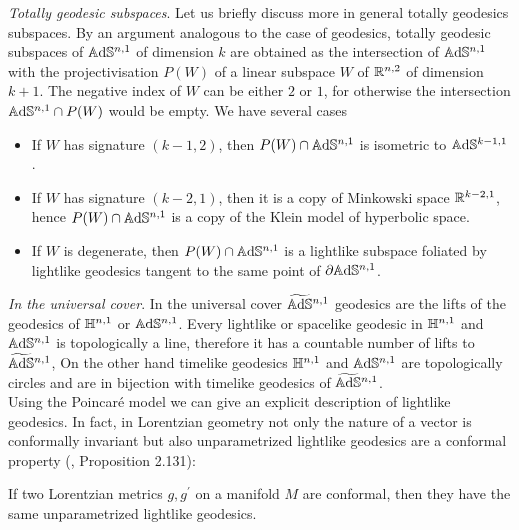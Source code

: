 \noindent \textit{Totally geodesic subspaces}. Let us briefly discuss more in general totally geodesics subspaces. By an argument analogous to the case of geodesics, totally geodesic subspaces of $\mathbb{A}\mathrm{d}\mathbb{S}^{n,1}$ of dimension $k$ are obtained as the intersection of $\mathbb{A}\mathrm{d}\mathbb{S}^{n,1}$ with the projectivisation $P(W)$ of a linear subspace $W$ of $\mathbb{R}^{n,2}$ of dimension $k+1$. The negative index of $W$ can be either $2$ or $1$, for otherwise the intersection $\mathbb{A}\mathrm{d}\mathbb{S}^{n,1}\cap P(W)$ would be empty.
We have several cases
\begin{itemize}
    \item If $W$ has signature $(k-1,2)$, then $P(W)\cap\mathbb{A}\mathrm{d}\mathbb{S}^{n,1}$  is isometric to $\mathbb{A}\mathrm{d}\mathbb{S}^{k-1,1}$.
    \item If $W$ has signature $(k-2,1)$, then it is a copy of Minkowski space $\mathbb{R}^{k-2,1}$, hence $P(W)\cap\mathbb{A}\mathrm{d}\mathbb{S}^{n,1}$ is a copy of the Klein model of hyperbolic space.
    \item If $W$ is degenerate, then $P(W)\cap\mathbb{A}\mathrm{d}\mathbb{S}^{n,1}$ is a lightlike subspace foliated by lightlike geodesics tangent to the same point of $\partial\mathbb{A}\mathrm{d}\mathbb{S}^{n,1}$. 
\end{itemize}

\noindent \textit{In the universal cover}. In the universal cover $\widetilde{\mathbb{A}\mathrm{d}\mathbb{S}}{}^{n,1}$ geodesics are the lifts of the geodesics of $\mathbb{H}^{n,1}$ or $\mathbb{A}\mathrm{d}\mathbb{S}^{n,1}$. Every lightlike or spacelike geodesic in $\mathbb{H}^{n,1}$ and $\mathbb{A}\mathrm{d}\mathbb{S}^{n,1}$ is topologically a line, therefore it has a countable number of lifts to $\widetilde{\mathbb{A}\mathrm{d}\mathbb{S}}{}^{n,1}$, On the other hand timelike geodesics $\mathbb{H}^{n,1}$ and $\mathbb{A}\mathrm{d}\mathbb{S}^{n,1}$ are topologically circles and are in bijection with timelike geodesics of $\widetilde{\mathbb{A}\mathrm{d}\mathbb{S}}{}^{n,1}$.\\
Using the Poincaré model we can give an explicit description of lightlike geodesics. In fact, in Lorentzian geometry not only the nature of a vector is conformally invariant but also unparametrized lightlike geodesics are a conformal property (\cite{Gallot}, Proposition 2.131): 
 \begin{theorem}\label{ConformalMetric} If two Lorentzian metrics $g,g^{\prime} $ on a manifold $M$ are conformal, then they have the same unparametrized lightlike geodesics.
 \end{theorem}

